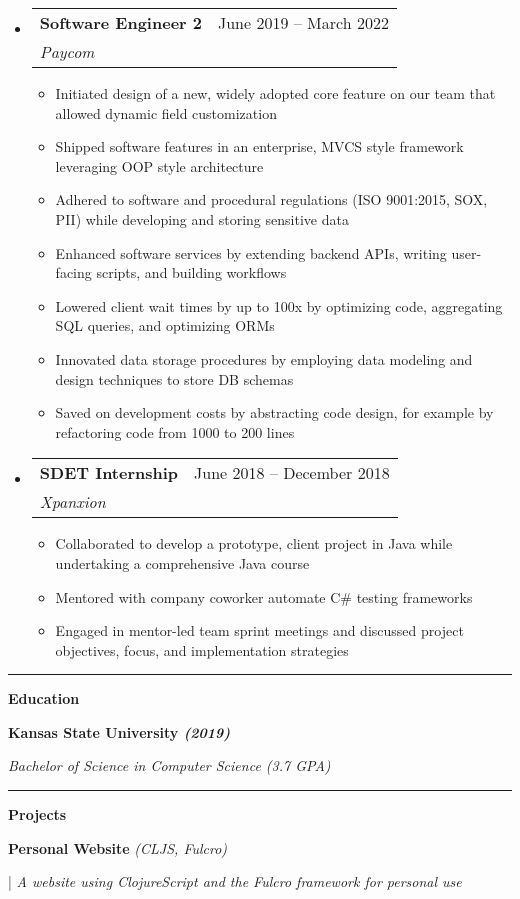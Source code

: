 \documentclass[letterpaper,11pt]{article}
\makeatletter
\newcommand{\resumeItem}[1]{
  \item\small{
    {#1 \vspace{-2pt}}
  }
}
\newcommand{\resumeSubheading}[4]{
  \vspace{-2pt}\item
    \begin{tabular*}{0.97\textwidth}[t]{l@{\extracolsep{\fill}}r}
      \textbf{#1} & #2 \\
      \textit{\small#3} & \textit{\small #4} \\
    \end{tabular*}\vspace{0pt}
}
\newcommand{\resumeSubHeadingListStart}{\begin{itemize}[leftmargin=0.15cm, label={}]}
\newcommand{\resumeSubHeadingListEnd}{\end{itemize}}
\newcommand{\resumeItemListStart}{\begin{itemize}}
\newcommand{\resumeItemListEnd}{\end{itemize}\vspace{-5pt}}
\makeatother
\begin{document}
\resumeSubHeadingListStart
\resumeSubheading
{Software Engineer 2}{June 2019 – March 2022}
{Paycom}{}
\resumeItemListStart
\resumeItem{ Initiated design of a new, widely adopted core feature on our team that allowed dynamic field customization }
\resumeItem{ Shipped software features in an enterprise, MVCS style framework leveraging OOP style architecture}
\resumeItem{ Adhered to software and procedural regulations (ISO 9001:2015, SOX, PII) while developing and storing sensitive data }
\resumeItem{ Enhanced software services by extending backend APIs, writing user-facing scripts, and building workflows }
\resumeItem{ Lowered client wait times by up to 100x by optimizing code, aggregating SQL queries, and optimizing ORMs }
\resumeItem{ Innovated data storage procedures by employing data modeling and design techniques to store DB schemas }
\resumeItem{ Saved on development costs by abstracting code design, for example by refactoring code from 1000 to 200 lines }
\resumeItemListEnd
\resumeSubHeadingListEnd
\resumeSubHeadingListStart
\resumeSubheading
{SDET Internship}{June 2018 – December 2018}
{Xpanxion}{}
\resumeItemListStart
\resumeItem{ Collaborated to develop a prototype, client project in Java while undertaking a comprehensive Java course }
\resumeItem{ Mentored with company coworker automate C\# testing frameworks }
\resumeItem{ Engaged in mentor-led team sprint meetings and discussed project objectives, focus, and implementation strategies }
\resumeItemListEnd
\resumeSubHeadingListEnd
\noindent\rule{19.5cm}{0.4pt}

\textbf{\large \textcolor{magic_blue}{Education}}

\begin{minipage}[t]{0.45\textwidth}
  \raggedright
  \textbf{ Kansas State University \textit{(2019)}} \\
\end{minipage}
\hfill
\begin{minipage}[t]{0.45\textwidth}
  \raggedleft
  \textit{Bachelor of Science in Computer Science (3.7 GPA)} \\
\end{minipage}
\noindent\rule{19.5cm}{0.4pt}

\textbf{\large \textcolor{magic_blue}{Projects}}

\begin{minipage}[t]{0.28\textwidth}
  \raggedright
  \textbf{ Personal Website }\textit{(CLJS, Fulcro)} \\
\end{minipage}
\hfill
\begin{minipage}[t]{0.70\textwidth}
  \raggedright
  |\textit{ A website using ClojureScript and the Fulcro framework for personal use} \\
\end{minipage}
\end{document}
